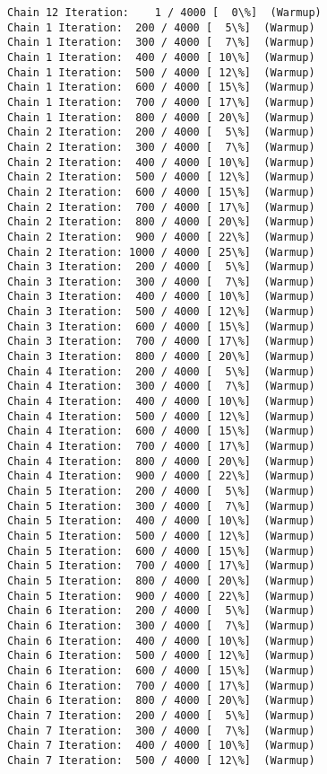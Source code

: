 \documentclass[11pt]{article}
\begin{document}
    \begin{Verbatim}[commandchars=\\\{\}]
Chain 12 Iteration:    1 / 4000 [  0\%]  (Warmup)
Chain 1 Iteration:  200 / 4000 [  5\%]  (Warmup)
Chain 1 Iteration:  300 / 4000 [  7\%]  (Warmup)
Chain 1 Iteration:  400 / 4000 [ 10\%]  (Warmup)
Chain 1 Iteration:  500 / 4000 [ 12\%]  (Warmup)
Chain 1 Iteration:  600 / 4000 [ 15\%]  (Warmup)
Chain 1 Iteration:  700 / 4000 [ 17\%]  (Warmup)
Chain 1 Iteration:  800 / 4000 [ 20\%]  (Warmup)
Chain 2 Iteration:  200 / 4000 [  5\%]  (Warmup)
Chain 2 Iteration:  300 / 4000 [  7\%]  (Warmup)
Chain 2 Iteration:  400 / 4000 [ 10\%]  (Warmup)
Chain 2 Iteration:  500 / 4000 [ 12\%]  (Warmup)
Chain 2 Iteration:  600 / 4000 [ 15\%]  (Warmup)
Chain 2 Iteration:  700 / 4000 [ 17\%]  (Warmup)
Chain 2 Iteration:  800 / 4000 [ 20\%]  (Warmup)
Chain 2 Iteration:  900 / 4000 [ 22\%]  (Warmup)
Chain 2 Iteration: 1000 / 4000 [ 25\%]  (Warmup)
Chain 3 Iteration:  200 / 4000 [  5\%]  (Warmup)
Chain 3 Iteration:  300 / 4000 [  7\%]  (Warmup)
Chain 3 Iteration:  400 / 4000 [ 10\%]  (Warmup)
Chain 3 Iteration:  500 / 4000 [ 12\%]  (Warmup)
Chain 3 Iteration:  600 / 4000 [ 15\%]  (Warmup)
Chain 3 Iteration:  700 / 4000 [ 17\%]  (Warmup)
Chain 3 Iteration:  800 / 4000 [ 20\%]  (Warmup)
Chain 4 Iteration:  200 / 4000 [  5\%]  (Warmup)
Chain 4 Iteration:  300 / 4000 [  7\%]  (Warmup)
Chain 4 Iteration:  400 / 4000 [ 10\%]  (Warmup)
Chain 4 Iteration:  500 / 4000 [ 12\%]  (Warmup)
Chain 4 Iteration:  600 / 4000 [ 15\%]  (Warmup)
Chain 4 Iteration:  700 / 4000 [ 17\%]  (Warmup)
Chain 4 Iteration:  800 / 4000 [ 20\%]  (Warmup)
Chain 4 Iteration:  900 / 4000 [ 22\%]  (Warmup)
Chain 5 Iteration:  200 / 4000 [  5\%]  (Warmup)
Chain 5 Iteration:  300 / 4000 [  7\%]  (Warmup)
Chain 5 Iteration:  400 / 4000 [ 10\%]  (Warmup)
Chain 5 Iteration:  500 / 4000 [ 12\%]  (Warmup)
Chain 5 Iteration:  600 / 4000 [ 15\%]  (Warmup)
Chain 5 Iteration:  700 / 4000 [ 17\%]  (Warmup)
Chain 5 Iteration:  800 / 4000 [ 20\%]  (Warmup)
Chain 5 Iteration:  900 / 4000 [ 22\%]  (Warmup)
Chain 6 Iteration:  200 / 4000 [  5\%]  (Warmup)
Chain 6 Iteration:  300 / 4000 [  7\%]  (Warmup)
Chain 6 Iteration:  400 / 4000 [ 10\%]  (Warmup)
Chain 6 Iteration:  500 / 4000 [ 12\%]  (Warmup)
Chain 6 Iteration:  600 / 4000 [ 15\%]  (Warmup)
Chain 6 Iteration:  700 / 4000 [ 17\%]  (Warmup)
Chain 6 Iteration:  800 / 4000 [ 20\%]  (Warmup)
Chain 7 Iteration:  200 / 4000 [  5\%]  (Warmup)
Chain 7 Iteration:  300 / 4000 [  7\%]  (Warmup)
Chain 7 Iteration:  400 / 4000 [ 10\%]  (Warmup)
Chain 7 Iteration:  500 / 4000 [ 12\%]  (Warmup)

\end{Verbatim}
\end{document}
